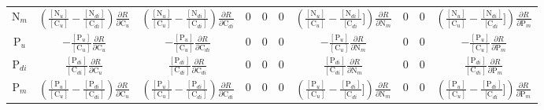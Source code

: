 \documentclass[12pt, a4paper]{article}
\begin{document}
\begin{table}[hb]
{\begin{tabular}{ c | ccccccccc }
  N$_m$    &$\left(\frac{[\text{N}_u]}{[\text{C}_u]} - \frac{[\text{N}_{di}]}{[\text{C}_{di}]}\right)\frac{\partial R}{\partial \text{C}_u}$  & $\left(\frac{[\text{N}_u]}{[\text{C}_u]} - \frac{[\text{N}_{di}]}{[\text{C}_{di}]}\right)\frac{\partial R}{\partial \text{C}_{di}} $  & 0 & 0   & 0 & $\left(\frac{[\text{N}_u]}{[\text{C}_u]} - \frac{[\text{N}_{di}]}{[\text{C}_{di}}]\right) \frac{\partial R}{\partial \text{N}_m} $ & 0   & 0 & $\left(\frac{[\text{N}_u]}{[\text{C}_u]} - \frac{[\text{N}_{di}]}{[\text{C}_{di}}]\right) \frac{\partial R}{\partial \text{P}_m} $\\
  P$_u$      &$-\frac{[\text{P}_u]}{[\text{C}_u]}\frac{\partial R}{\partial \text{C}_u}$  & $-\frac{[\text{P}_u]}{[\text{C}_u]}\frac{\partial R}{\partial \text{C}_{di}}$ & 0 & 0 &0&$-\frac{[\text{P}_u]}{[\text{C}_u]}\frac{\partial R}{\partial \text{N}_m} $ & 0 &0&$-\frac{[\text{P}_u]}{[\text{C}_u]}\frac{\partial R}{\partial \text{P}_m} $\\
  P$_{di}$    &$\frac{[\text{P}_{di}]}{[\text{C}_{di}]} \frac{\partial R}{\partial \text{C}_u}$  & $\frac{[\text{P}_{di}]}{[\text{C}_{di}]} \frac{\partial R}{\partial \text{C}_{di}}$  & 0 & 0 & 0  & $\frac{[\text{P}_{di}]}{[\text{C}_{di}]} \frac{\partial R}{\partial \text{N}_m}$ & 0 & 0  & $\frac{[\text{P}_{di}]}{[\text{C}_{di}]} \frac{\partial R}{\partial \text{P}_m}$\\
  P$_m$    &$\left(\frac{[\text{P}_u]}{[\text{C}_u]} - \frac{[\text{P}_{di}]}{[\text{C}_{di}]}\right)\frac{\partial R}{\partial \text{C}_u}$  & $\left(\frac{[\text{P}_u]}{[\text{C}_u]} - \frac{[\text{P}_{di}]}{[\text{C}_{di}]}\right)\frac{\partial R}{\partial \text{C}_{di}} $  & 0 & 0   & 0 & $\left(\frac{[\text{P}_u]}{[\text{C}_u]} - \frac{[\text{P}_{di}]}{[\text{C}_{di}}]\right) \frac{\partial R}{\partial \text{N}_m} $ & 0   & 0 & $\left(\frac{[\text{P}_u]}{[\text{C}_u]} - \frac{[\text{P}_{di}]}{[\text{C}_{di}}]\right) \frac{\partial R}{\partial \text{P}_m} $ \\
  \end{tabular}
  }
\end{table}
\end{document}
